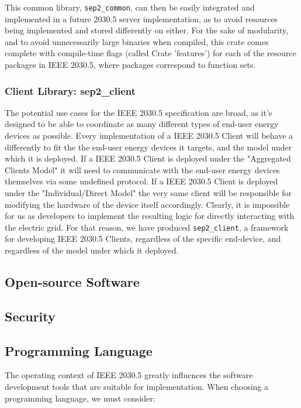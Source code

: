 This common library, \texttt{sep2\_common}, can then be easily integrated and implemented in a future 2030.5 server implementation, as to avoid resources being implemented and stored differently on either. 
For the sake of modularity, and to avoid unnecessarily large binaries when compiled, this crate comes complete with compile-time flags (called Crate 'features') for each of the resource packages in IEEE 2030.5, where packages correspond to function sets.

\subsubsection{Client Library: \- sep2\_client}
The potential use cases for the IEEE 2030.5 specification are broad, as it's designed to be able to coordinate as many different types of end-user energy devices as possible.
Every implementation of a IEEE 2030.5 Client will behave a differently to fit the the end-user energy devices it targets, and the model under which it is deployed. 
If a IEEE 2030.5 Client is deployed under the "Aggregated Clients Model" it will need to communicate with the end-user energy devices themselves via some undefined protocol.
If a IEEE 2030.5 Client is deployed under the "Individual/Direct Model" the very same client will be responsible for modifying the hardware of the device itself accordingly. 
Clearly, it is impossible for us as developers to implement the resulting logic for directly interacting with the electric grid.
For that reason, we have produced \texttt{sep2\_client}, a framework for developing IEEE 2030.5 Clients, regardless of the specific end-device, and regardless of the model under which it deployed.

\subsection{Open-source Software}

\subsection{Security}

\subsection{Programming Language}
The operating context of IEEE 2030.5 greatly influences the software development tools that are suitable for implementation.
When choosing a programming language, we must consider:

